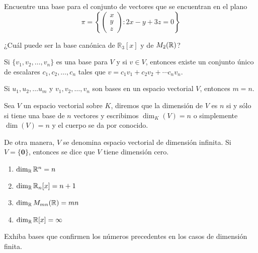 \begin{ejem}
Encuentre una base para el conjunto de vectores que se encuentran en el plano 
\[\pi = \left\{ \begin{pmatrix} x \\ y \\ z \end{pmatrix} : 2x-y+3z=0 \right\}\]
\end{ejem}





\begin{ejem}
¿Cuál puede ser la base canónica de $\mathbb{R}_3[x]$ y de $M_{2 }(\mathbb{R})$?
\end{ejem}





\begin{thm}
Si $\{ v_1,v_2, \dots, v_n \}$ es una base para $V$ y si $v \in V$, entonces existe un conjunto único de escalares $c_1, c_2, \dots, c_n$ tales que $v = c_1v_1+c_2v_2 + \cdots c_nv_n$.
\end{thm}

\begin{thm}
Si $u_1,u_2, \dots u_m$ y $v_1,v_2, \dots, v_n$ son bases en un espacio vectorial $V$, entonces $m = n$.
\end{thm}

\begin{defin}
Sea $V$ un espacio vectorial sobre $K$, diremos que la dimensión de $V$ es $n$ si y sólo si tiene
una base de $n$ vectores y escribimos $\dim_K(V)=n$ o simplemente $\dim(V)=n$ y el cuerpo se da por conocido.

De otra manera, $V$ se denomina espacio vectorial de dimensión infinita. Si $V = \{ \textbf{0} \}$, entonces se dice que $V$ tiene dimensión cero.
\end{defin}





\begin{ejem}
\begin{enumerate}
\item
$\dim_{\mathbb{R}}\mathbb{R}^n = n$


\item
$\dim_{\mathbb{R}}\mathbb{\mathbb{R}}_n[x] = n+1$


\item
$\dim_{\mathbb{R}} M_{mn}(\mathbb{R}) = mn$


\item
$\dim_{\mathbb{R}}\mathbb{\mathbb{R}}[x] = \infty$
\end{enumerate}
\end{ejem}
\begin{ejer}
Exhiba bases que confirmen los números precedentes en los casos de dimensión finita.
\end{ejer}



